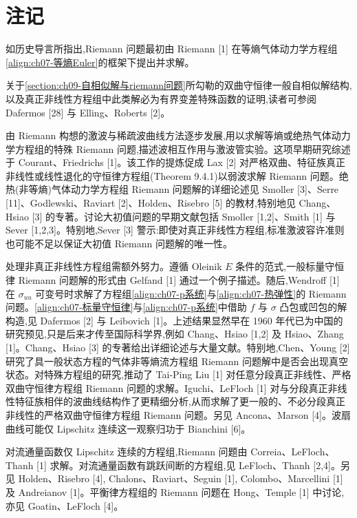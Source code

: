 \documentclass[../../main.tex]{subfiles}
\begin{document}
\section{注记}\label{section:ch09-注记}

如历史导言所指出,Riemann 问题最初由 Riemann [1] 在等熵气体动力学方程组\eqref{align:ch07-等熵Euler}的框架下提出并求解。

关于\cref{section:ch09-自相似解与riemann问题}所勾勒的双曲守恒律一般自相似解结构,以及真正非线性方程组中此类解必为有界变差特殊函数的证明,读者可参阅 Dafermos [28] 与 Elling、Roberts [2]。

由 Riemann 构想的激波与稀疏波曲线方法逐步发展,用以求解等熵或绝热气体动力学方程组的特殊 Riemann 问题,描述波相互作用与激波管实验。这项早期研究综述于 Courant、Friedrichs [1]。该工作的提炼促成 Lax [2] 对严格双曲、特征族真正非线性或线性退化的守恒律方程组(Theorem 9.4.1)以弱波求解 Riemann 问题。绝热(非等熵)气体动力学方程组 Riemann 问题解的详细论述见 Smoller [3]、Serre [11]、Godlewski、Raviart [2]、Holden、Risebro [5] 的教材,特别地见 Chang、Hsiao [3] 的专著。讨论大初值问题的早期文献包括 Smoller [1,2]、Smith [1] 与 Sever [1,2,3]。特别地,Sever [3] 警示:即使对真正非线性方程组,标准激波容许准则也可能不足以保证大初值 Riemann 问题解的唯一性。

处理非真正非线性方程组需额外努力。遵循 Oleinik $E$ 条件的范式,一般标量守恒律 Riemann 问题解的形式由 Gelfand [1] 通过一个例子描述。随后,Wendroff [1] 在 $\sigma_{uu}$ 可变号时求解了方程组\eqref{align:ch07-p系统}与\eqref{align:ch07-热弹性}的 Riemann 问题。\eqref{align:ch07-标量守恒律}与\eqref{align:ch07-p系统}中借助 $f$ 与 $\sigma$ 凸包或凹包的解构造,见 Dafermos [2] 与 Leibovich [1]。上述结果显然早在 1960 年代已为中国的研究预见,只是后来才传至国际科学界,例如 Chang、Hsiao [1,2] 及 Hsiao、Zhang [1]。Chang、Hsiao [3] 的专著给出详细论述与大量文献。特别地,Chen、Young [2] 研究了具一般状态方程的气体非等熵流方程组 Riemann 问题解中是否会出现真空状态。对特殊方程组的研究,推动了 Tai-Ping Liu [1] 对任意分段真正非线性、严格双曲守恒律方程组 Riemann 问题的求解。Iguchi、LeFloch [1] 对与分段真正非线性特征族相伴的波曲线结构作了更精细分析,从而求解了更一般的、不必分段真正非线性的严格双曲守恒律方程组 Riemann 问题。另见 Ancona、Marson [4]。波扇曲线可能仅 Lipschitz 连续这一观察归功于 Bianchini [6]。

对流通量函数仅 Lipschitz 连续的方程组,Riemann 问题由 Correia、LeFloch、Thanh [1] 求解。对流通量函数有跳跃间断的方程组,见 LeFloch、Thanh [2,4]。另见 Holden、Risebro [4], Chalons、Raviart、Seguin [1], Colombo、Marcellini [1] 及 Andreianov [1]。平衡律方程组的 Riemann 问题在 Hong、Temple [1] 中讨论,亦见 Goatin、LeFloch [4]。
\end{document}
